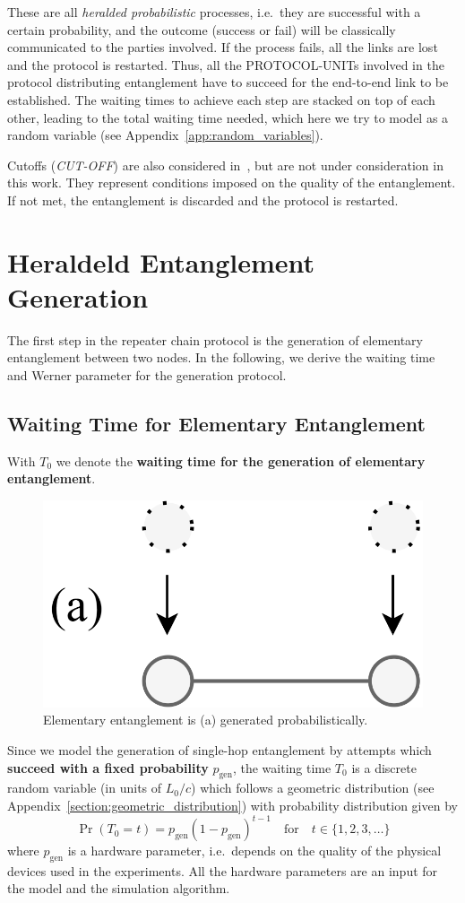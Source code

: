 \documentclass{masterthesis}
\begin{document}
These are all \textit{heralded probabilistic} processes, i.e.\ they are successful with a certain probability, and the outcome (success or fail) will be classically communicated to the parties involved. If the process fails, all the links are lost and the protocol is restarted. Thus, all the PROTOCOL-UNITs involved in the protocol distributing entanglement have to succeed for the end-to-end link to be established. The waiting times to achieve each step are stacked on top of each other, leading to the total waiting time needed, which here we try to model as a random variable (see Appendix~\ref{app:random_variables}).

Cutoffs (\textit{CUT-OFF}) are also considered in~\cite{Li_2021}, but are not under consideration in this work.
They represent conditions imposed on the quality of the entanglement. If not met, the entanglement is discarded and the protocol is restarted.

\section{Heraldeld Entanglement Generation}\label{section:heralded_entanglement_generation}

The first step in the repeater chain protocol is the generation of elementary entanglement between two nodes. %
In the following, we derive the waiting time and Werner parameter for the generation protocol.

\subsection{Waiting Time for Elementary Entanglement}

With $T_0$ we denote the \textbf{waiting time for the generation of elementary entanglement}.

\begin{figure}[ht]
    \centering
    \includegraphics[width=0.33\linewidth]{images/gen.png}
    \caption{Elementary entanglement is (a) generated probabilistically.}\label{fig:gen}
\end{figure}

Since we model the generation of single-hop entanglement by attempts which \textbf{succeed with a fixed probability} $p_{\text{gen}}$, the waiting time $T_0$ is a discrete random variable (in units of $L_0 /c$) which follows a geometric distribution (see Appendix~\ref{section:geometric_distribution}) with probability distribution given by 
\begin{equation}
    \Pr(T_0 = t) = p_{\text{gen}} {(1 - p_{\text{gen}})}^{t-1} \quad \text{for} \quad t \in \{1, 2, 3, \ldots \}
\end{equation}
where $p_{\text{gen}}$ is a hardware parameter, i.e.\ depends on the quality of the physical devices used in the experiments.
All the hardware parameters are an input for the model and the simulation algorithm.
\end{document}
